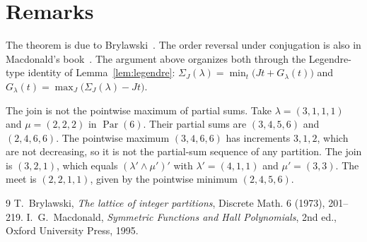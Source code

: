 \documentclass[11pt]{article}
\theoremstyle{plain}
\theoremstyle{definition}
\theoremstyle{remark}
\newcommand{\Par}{\operatorname{Par}}
\begin{document}
\section{Remarks}


The theorem is due to Brylawski~\cite{bry}. The order reversal under
conjugation is also in Macdonald's book~\cite[Ch.~I, (1.11)]{mac}. The
argument above organizes both through the Legendre-type identity of
Lemma~\ref{lem:legendre}:
$\Sigma_J(\lambda)=\min_t\bigl(Jt+G_\lambda(t)\bigr)$ and
$G_\lambda(t)=\max_J\bigl(\Sigma_J(\lambda)-Jt\bigr)$.

The join is not the pointwise maximum of partial sums. Take
$\lambda=(3,1,1,1)$ and $\mu=(2,2,2)$ in $\Par(6)$. Their partial sums are
$(3,4,5,6)$ and $(2,4,6,6)$. The pointwise maximum $(3,4,6,6)$ has increments
$3,1,2$, which are not decreasing, so it is not the partial-sum sequence of any
partition. The join is $(3,2,1)$, which equals $(\lambda'\wedge\mu')'$ with
$\lambda'=(4,1,1)$ and $\mu'=(3,3)$. The meet is $(2,2,1,1)$, given by the
pointwise minimum $(2,4,5,6)$.

\begin{thebibliography}{9}
 T.~Brylawski, \emph{The lattice of integer partitions},
  Discrete Math. 6 (1973), 201--219.
 I.~G.~Macdonald, \emph{Symmetric Functions and Hall
  Polynomials}, 2nd ed., Oxford University Press, 1995.
\end{thebibliography}
\end{document}
